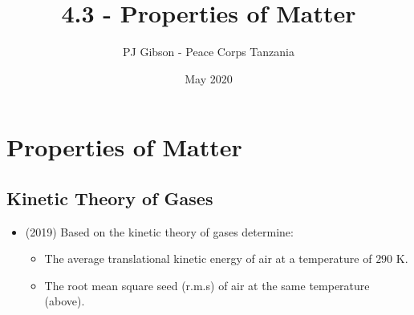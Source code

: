 \documentclass{article}
\title{4.3 - Properties of Matter}
\author{PJ Gibson - Peace Corps Tanzania}
\date{May 2020}
\begin{document}
\maketitle


\section{Properties of Matter}

\subsection{Kinetic Theory of Gases}
\begin{itemize}
\item (2019)  Based on the kinetic theory of gases determine:
 \begin{itemize}
\item The average translational kinetic energy of air at a temperature of $ 290$ K.
\item The root mean square seed (r.m.s) of air at the same temperature (above).
\end{itemize}
\end{itemize}
\end{document}
